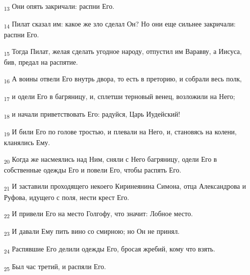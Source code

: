 \begin{tcolorbox}
\textsubscript{13} Они опять закричали: распни Его.
\end{tcolorbox}
\begin{tcolorbox}
\textsubscript{14} Пилат сказал им: какое же зло сделал Он? Но они еще сильнее закричали: распни Его.
\end{tcolorbox}
\begin{tcolorbox}
\textsubscript{15} Тогда Пилат, желая сделать угодное народу, отпустил им Варавву, а Иисуса, бив, предал на распятие.
\end{tcolorbox}
\begin{tcolorbox}
\textsubscript{16} А воины отвели Его внутрь двора, то есть в преторию, и собрали весь полк,
\end{tcolorbox}
\begin{tcolorbox}
\textsubscript{17} и одели Его в багряницу, и, сплетши терновый венец, возложили на Него;
\end{tcolorbox}
\begin{tcolorbox}
\textsubscript{18} и начали приветствовать Его: радуйся, Царь Иудейский!
\end{tcolorbox}
\begin{tcolorbox}
\textsubscript{19} И били Его по голове тростью, и плевали на Него, и, становясь на колени, кланялись Ему.
\end{tcolorbox}
\begin{tcolorbox}
\textsubscript{20} Когда же насмеялись над Ним, сняли с Него багряницу, одели Его в собственные одежды Его и повели Его, чтобы распять Его.
\end{tcolorbox}
\begin{tcolorbox}
\textsubscript{21} И заставили проходящего некоего Киринеянина Симона, отца Александрова и Руфова, идущего с поля, нести крест Его.
\end{tcolorbox}
\begin{tcolorbox}
\textsubscript{22} И привели Его на место Голгофу, что значит: Лобное место.
\end{tcolorbox}
\begin{tcolorbox}
\textsubscript{23} И давали Ему пить вино со смирною; но Он не принял.
\end{tcolorbox}
\begin{tcolorbox}
\textsubscript{24} Распявшие Его делили одежды Его, бросая жребий, кому что взять.
\end{tcolorbox}
\begin{tcolorbox}
\textsubscript{25} Был час третий, и распяли Его.
\end{tcolorbox}
